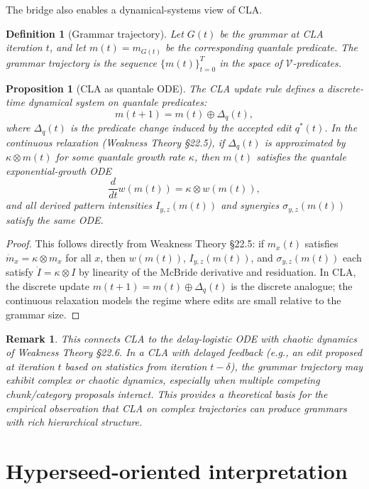 \documentclass[11pt]{article}
\newtheorem{definition}{Definition}
\newtheorem{proposition}{Proposition}
\newtheorem{remark}{Remark}
\begin{document}
The bridge also enables a dynamical-systems view of CLA.

\begin{definition}[Grammar trajectory]
\label{def:grammar-trajectory}
Let $G(t)$ be the grammar at CLA iteration $t$, and let $m(t) = m_{G(t)}$ be the corresponding quantale predicate.  The \emph{grammar trajectory} is the sequence $\{m(t)\}_{t=0}^{T}$ in the space of $\mathcal{V}$-predicates.
\end{definition}

\begin{proposition}[CLA as quantale ODE]
\label{prop:cla-ode}
The CLA update rule defines a discrete-time dynamical system on quantale predicates:
\[
  m(t+1) = m(t) \oplus \Delta_q(t),
\]
where $\Delta_q(t)$ is the predicate change induced by the accepted edit $q^*(t)$.  In the continuous relaxation (Weakness Theory \S 22.5), if $\Delta_q(t)$ is approximated by $\kappa \otimes m(t)$ for some quantale growth rate $\kappa$, then $m(t)$ satisfies the quantale exponential-growth ODE
\[
  \frac{d}{dt} w(m(t)) = \kappa \otimes w(m(t)),
\]
and all derived pattern intensities $I_{y,z}(m(t))$ and synergies $\sigma_{y,z}(m(t))$ satisfy the same ODE.
\end{proposition}

\begin{proof}
This follows directly from Weakness Theory \S 22.5: if $m_x(t)$ satisfies $\dot{m}_x = \kappa \otimes m_x$ for all $x$, then $w(m(t))$, $I_{y,z}(m(t))$, and $\sigma_{y,z}(m(t))$ each satisfy $\dot{I} = \kappa \otimes I$ by linearity of the McBride derivative and residuation.  In CLA, the discrete update $m(t+1) = m(t) \oplus \Delta_q(t)$ is the discrete analogue; the continuous relaxation models the regime where edits are small relative to the grammar size.
\end{proof}

\begin{remark}
This connects CLA to the delay-logistic ODE with chaotic dynamics of Weakness Theory \S 22.6.  In a CLA with delayed feedback (e.g., an edit proposed at iteration $t$ based on statistics from iteration $t - \delta$), the grammar trajectory may exhibit complex or chaotic dynamics, especially when multiple competing chunk/category proposals interact.  This provides a theoretical basis for the empirical observation that CLA on complex trajectories can produce grammars with rich hierarchical structure.
\end{remark}

\section{Hyperseed-oriented interpretation}
\end{document}
